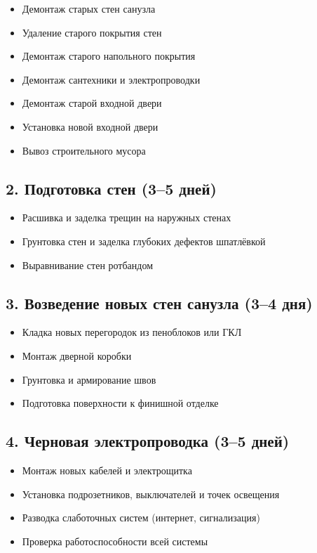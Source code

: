 \documentclass[11pt]{article}
\begin{document}
\begin{itemize}
\item Демонтаж старых стен санузла
\item Удаление старого покрытия стен
\item Демонтаж старого напольного покрытия
\item Демонтаж сантехники и электропроводки
\item Демонтаж старой входной двери
\item Установка новой входной двери
\item Вывоз строительного мусора
\end{itemize}
\subsection{2. Подготовка стен (3–5 дней)}
\label{sec:org6127f6a}

\begin{itemize}
\item Расшивка и заделка трещин на наружных стенах
\item Грунтовка стен и заделка глубоких дефектов шпатлёвкой
\item Выравнивание стен ротбандом
\end{itemize}
\subsection{3. Возведение новых стен санузла (3–4 дня)}
\label{sec:org7199320}

\begin{itemize}
\item Кладка новых перегородок из пеноблоков или ГКЛ
\item Монтаж дверной коробки
\item Грунтовка и армирование швов
\item Подготовка поверхности к финишной отделке
\end{itemize}
\subsection{4. Черновая электропроводка (3–5 дней)}
\label{sec:org7e127fe}

\begin{itemize}
\item Монтаж новых кабелей и электрощитка
\item Установка подрозетников, выключателей и точек освещения
\item Разводка слаботочных систем (интернет, сигнализация)
\item Проверка работоспособности всей системы
\end{itemize}
\end{document}
